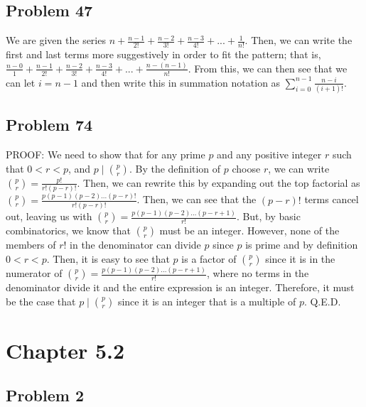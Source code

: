 \documentclass{article}
\begin{document}
\subsection*{Problem 47}

We are given the series $n + \frac{n-1}{2!} + \frac{n-2}{3!} + \frac{n-3}{4!} + ... + \frac{1}{n!}$. Then, we can write the first and last terms more suggestively in order to fit the pattern; that is, $\frac{n-0}{1} + \frac{n-1}{2!} + \frac{n-2}{3!} + \frac{n-3}{4!} + ... + \frac{n-(n-1)}{n!}$. From this, we can then see that we can let $i = n -1$ and then write this in summation notation as $\sum\limits_{i=0}^{n-1} \frac{n-i}{(i+1)!}$.

\subsection*{Problem 74}

PROOF: We need to show that for any prime $p$ and any positive integer $r$ such that $0<r<p$, and $p \mid \binom{p}{r}$. By the definition of $p$ choose $r$, we can write $\binom{p}{r} = \frac{p!}{r!(p-r)!}$. Then, we can rewrite this by expanding out the top factorial as $\binom{p}{r} = \frac{p(p-1)(p-2)...(p-r)!}{r!(p-r)!}$. Then, we can see that the $(p-r)!$ terms cancel out, leaving us with $\binom{p}{r} = \frac{p(p-1)(p-2)...(p-r+1)}{r!}$. But, by basic combinatorics, we know that $\binom{p}{r}$ must be an integer. However, none of the members of $r!$ in the denominator can divide $p$ since $p$ is prime and by definition $0<r<p$. Then, it is easy to see that $p$ is a factor of $\binom{p}{r}$ since it is in the numerator of $\binom{p}{r} = \frac{p(p-1)(p-2)...(p-r+1)}{r!}$, where no terms in the denominator divide it and the entire expression is an integer. Therefore, it must be the case that $p \mid \binom{p}{r}$ since it is an integer that is a multiple of $p$. Q.E.D.


\section*{Chapter 5.2}

\subsection*{Problem 2}
\end{document}
